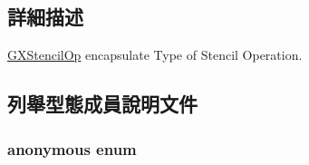 \subsection{詳細描述}
\hyperlink{class_i_dream_sky_1_1_g_x_stencil_op}{G\+X\+Stencil\+Op} encapsulate Type of Stencil Operation. 

\subsection{列舉型態成員說明文件}
\subsubsection[{\texorpdfstring{anonymous enum}{anonymous enum}}]{\setlength{\rightskip}{0pt plus 5cm}anonymous enum}\hypertarget{class_i_dream_sky_1_1_g_x_stencil_op_a533e11d2d23e3d4be076ac38a613cb65}{}\label{class_i_dream_sky_1_1_g_x_stencil_op_a533e11d2d23e3d4be076ac38a613cb65}
